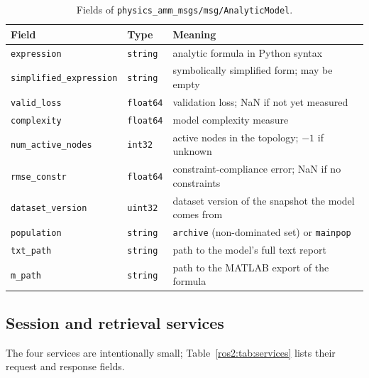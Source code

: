 \begin{table}[tb]
  \centering
  \caption{Fields of \texttt{physics\_amm\_msgs/msg/AnalyticModel}.}
  \label{ros2:tab:analyticmodel}
  \footnotesize
  \begin{tabular}{@{}llp{7.2cm}@{}}
    \toprule
    Field & Type & Meaning \\
    \midrule
    \texttt{expression}            & \texttt{string}  & analytic formula in Python syntax \\
    \texttt{simplified\_expression}& \texttt{string}  & symbolically simplified form; may be empty \\
    \texttt{valid\_loss}           & \texttt{float64} & validation loss; NaN if not yet measured \\
    \texttt{complexity}            & \texttt{float64} & model complexity measure \\
    \texttt{num\_active\_nodes}    & \texttt{int32}   & active nodes in the topology; $-1$ if unknown \\
    \texttt{rmse\_constr}          & \texttt{float64} & constraint-compliance error; NaN if no constraints \\
    \texttt{dataset\_version}      & \texttt{uint32}  & dataset version of the snapshot the model comes from \\
    \texttt{population}            & \texttt{string}  & \texttt{archive} (non-dominated set) or \texttt{mainpop} \\
    \texttt{txt\_path}             & \texttt{string}  & path to the model's full text report \\
    \texttt{m\_path}               & \texttt{string}  & path to the MATLAB export of the formula \\
    \bottomrule
  \end{tabular}
\end{table}

\subsection{Session and retrieval services}
\label{ros2:sec:services}

The four services are intentionally small;
Table~\ref{ros2:tab:services} lists their request and response fields.

